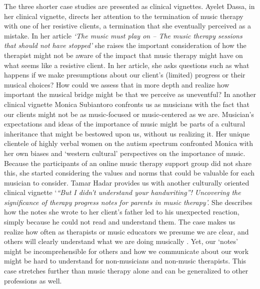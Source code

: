 \documentclass[authordate, empirical, issue]{jote-new-article}
\begin{document}
The three shorter case studies are presented as clinical vignettes. Ayelet Dassa, in her clinical vignette, directs her attention to the termination of music therapy with one of her resistive clients, a termination that she eventually perceived as a mistake. In her article \emph{‘The music must play on -- The music therapy sessions that should not have stopped' }she raises the important consideration of how the therapist might not be aware of the impact that music therapy might have on what seems like a resistive client. In her article, she asks questions such as what happens if we make presumptions about our client's (limited) progress or their musical choices? How could we assess that in more depth and realize how important the musical bridge might be that we perceive as uneventful? In another clinical vignette Monica Subiantoro confronts us as musicians with the fact that our clients might not be as music-focused or music-centered as we are. Musician's expectations and ideas of the importance of music might be parts of a cultural inheritance that might be bestowed upon us, without us realizing it. Her unique clientele of highly verbal women on the autism spectrum confronted Monica with her own biases and ‘western cultural' perspectives on the importance of music. Because the participants of an online music therapy support group did not share this, she started considering the values and norms that could be valuable for each musician to consider. Tamar Hadar provides us with another culturally oriented clinical vignette ‘\emph{“But I didn't understand your handwriting”! Uncovering the significance of therapy progress notes for parents in music therapy'.} She describes how the notes she wrote to her client's father led to his unexpected reaction, simply because he could not read and understand them. The case makes us realize how often as therapists or music educators we presume we are clear, and others will clearly understand what we are doing musically . Yet, our ‘notes' might be incomprehensible for others and how we communicate about our work might be hard to understand for non-musicians and non-music therapists. This case stretches further than music therapy alone and can be generalized to other professions as well.
\end{document}
